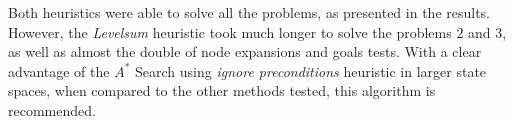 \documentclass[a4paper]{article}
\begin{document}
Both heuristics were able to solve all the problems, as presented in the results. However, the \textit{Levelsum} heuristic took much longer to solve the problems $2$ and $3$, as well as almost the double of node expansions and goals tests. With a clear advantage of the $A^{*}$ Search using \textit{ignore preconditions} heuristic in larger state spaces, when compared to the other methods tested, this algorithm is recommended.











\end{document}
